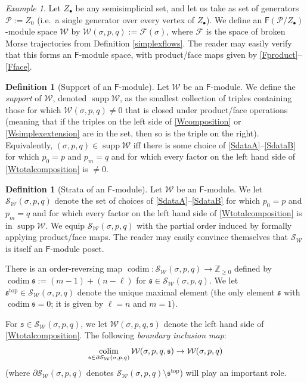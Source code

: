 \documentclass[12pt]{article}
\theoremstyle{definition}
\newtheorem{definition}[theorem]{Definition}
\theoremstyle{remark}
\newtheorem{example}[theorem]{Example}
\numberwithin{equation}{subsection}
\newcommand{\F}{\mathcal F}
\newcommand{\W}{\mathcal W}
\newcommand{\s}{\mathfrak s}
\newcommand{\ZZ}{\mathbb Z}
\newcommand{\PPP}{\mathcal P}
\newcommand{\SSS}{\mathcal S}
\newcommand{\ttop}{\mathrm{top}}
\newcommand{\colim}{\operatornamewithlimits{colim}}
\newcommand{\codim}{\operatorname{codim}}
\newcommand{\sF}{\mathsf{F}}
\newcommand{\supp}{\operatorname{supp}}
\begin{document}
\begin{example}\label{Fmoduleexample}
Let $Z_\bullet$ be any semisimplicial set, and let us take as set of generators $\PPP:=Z_0$ (i.e.\ a single generator over every vertex of $Z_\bullet$).  We define an $\sF(\PPP/Z_\bullet)$-module space $\W$ by $\W(\sigma,p,q):=\F(\sigma)$, where $\F$ is the space of broken Morse trajectories from Definition \ref{simplexflows}.  The reader may easily verify that this forms an $\sF$-module space, with product/face maps given by \eqref{Fproduct}--\eqref{Fface}.
\end{example}

\begin{definition}[Support of an $\sF$-module]
Let $\W$ be an $\sF$-module.  We define the \emph{support} of $\W$, denoted $\supp\W$, as the smallest collection of triples containing those for which $\W(\sigma,p,q)\ne 0$ that is closed under product/face operations (meaning that if the triples on the left side of \eqref{Wcomposition} or \eqref{Wsimplexextension} are in the set, then so is the triple on the right).  Equivalently, $(\sigma,p,q)\in\supp\W$ iff there is some choice of \eqref{SdataA}--\eqref{SdataB} for which $p_0=p$ and $p_m=q$ and for which every factor on the left hand side of \eqref{Wtotalcomposition} is $\ne 0$.
\end{definition}

\begin{definition}[Strata of an $\sF$-module]
Let $\W$ be an $\sF$-module.  We let $\SSS_\W(\sigma,p,q)$ denote the set of choices of \eqref{SdataA}--\eqref{SdataB} for which $p_0=p$ and $p_m=q$ and for which every factor on the left hand side of \eqref{Wtotalcomposition} is in $\supp\W$.  We equip $\SSS_\W(\sigma,p,q)$ with the partial order induced by formally applying product/face maps.  The reader may easily convince themselves that $\SSS_\W$ is itself an $\sF$-module poset.

There is an order-reversing map $\codim:\SSS_\W(\sigma,p,q)\to\ZZ_{\geq 0}$ defined by $\codim\s:=(m-1)+(n-\ell)$ for $\s\in\SSS_\W(\sigma,p,q)$.  We let $\s^\ttop\in\SSS_\W(\sigma,p,q)$ denote the unique maximal element (the only element $\s$ with $\codim\s=0$; it is given by $\ell=n$ and $m=1$).

For $\s\in\SSS_\W(\sigma,p,q)$, we let $\W(\sigma,p,q,\s)$ denote the left hand side of \eqref{Wtotalcomposition}.  The following \emph{boundary inclusion map}:
\begin{equation}\label{boundaryinclusion}
\colim_{\s\in\partial\SSS_\W(\sigma,p,q)}\W(\sigma,p,q,\s)\to\W(\sigma,p,q)
\end{equation}
(where $\partial\SSS_\W(\sigma,p,q)$ denotes $\SSS_\W(\sigma,p,q)\setminus\s^\ttop$) will play an important role.
\end{definition}
\end{document}
